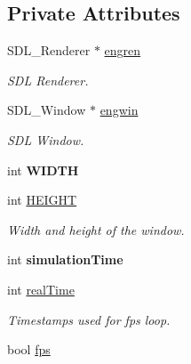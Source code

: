 \subsection*{Private Attributes}
\begin{DoxyCompactItemize}
\item 
S\+D\+L\+\_\+\+Renderer $\ast$ \hyperlink{classEngine_a1e579e93e790357bac1cfffd78b0286e}{engren}\hypertarget{classEngine_a1e579e93e790357bac1cfffd78b0286e}{}\label{classEngine_a1e579e93e790357bac1cfffd78b0286e}

\begin{DoxyCompactList}\small\item\em S\+DL Renderer. \end{DoxyCompactList}\item 
S\+D\+L\+\_\+\+Window $\ast$ \hyperlink{classEngine_a0ea9af2afce867a361cd8deaf9fcec16}{engwin}\hypertarget{classEngine_a0ea9af2afce867a361cd8deaf9fcec16}{}\label{classEngine_a0ea9af2afce867a361cd8deaf9fcec16}

\begin{DoxyCompactList}\small\item\em S\+DL Window. \end{DoxyCompactList}\item 
int {\bfseries W\+I\+D\+TH}\hypertarget{classEngine_a4936cdde2d50255f762466c05d69155d}{}\label{classEngine_a4936cdde2d50255f762466c05d69155d}

\item 
int \hyperlink{classEngine_aeb283222e500da8011acde9683a380ea}{H\+E\+I\+G\+HT}\hypertarget{classEngine_aeb283222e500da8011acde9683a380ea}{}\label{classEngine_aeb283222e500da8011acde9683a380ea}

\begin{DoxyCompactList}\small\item\em Width and height of the window. \end{DoxyCompactList}\item 
int {\bfseries simulation\+Time}\hypertarget{classEngine_a34d7a24f72086816f48b96339a681b04}{}\label{classEngine_a34d7a24f72086816f48b96339a681b04}

\item 
int \hyperlink{classEngine_a5a7e427c9b25bb05f67b81db17fbabb0}{real\+Time}\hypertarget{classEngine_a5a7e427c9b25bb05f67b81db17fbabb0}{}\label{classEngine_a5a7e427c9b25bb05f67b81db17fbabb0}

\begin{DoxyCompactList}\small\item\em Timestamps used for fps loop. \end{DoxyCompactList}\item 
bool \hyperlink{classEngine_add4dbfe65bb0eb01fdc68d5bc497ca79}{fps}\hypertarget{classEngine_add4dbfe65bb0eb01fdc68d5bc497ca79}{}\label{classEngine_add4dbfe65bb0eb01fdc68d5bc497ca79}


\end{DoxyCompactItemize}
